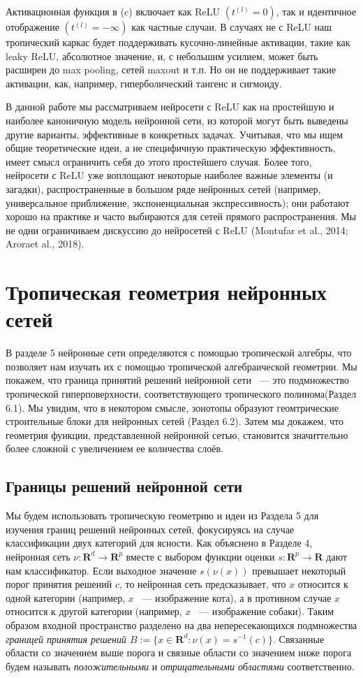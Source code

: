 \documentclass[russian]{lecture-notes}
\begin{document}
	Активационная функция в (c) включает как ReLU $(t^{(l)} = 0)$, так и идентичное отображение $(t^{(l)} = - \infty)$ как частные случаи. В случаях не с ReLU наш тропический каркас будет поддерживать кусочно-линейные активации, такие как leaky ReLU, абсолютное значение, и, с небольшим усилием, может быть расширен до max pooling, сетей maxout и т.п. Но он не поддерживает такие активации, как, например, гиперболический тангенс и сигмоиду.
	
	В данной работе мы  рассматриваем нейросети с ReLU как на простейшую и наиболее каноничную модель нейронной сети,  из которой могут быть выведены другие варианты, эффективные в конкретных задачах. Учитывая, что мы ищем общие теоретические идеи, а не специфичную практическую эффективность, имеет смысл ограничить себя до этого простейшего случая. Более того, нейросети с ReLU уже воплощают некоторые наиболее важные элементы (и загадки), распространенные в большом ряде нейронных сетей (например, универсальное приближение, экспоненциальная экспрессивность); они работают хорошо на практике и часто выбираются для сетей прямого распространения. Мы не одни ограничиваем дискуссию до нейросетей с ReLU  (Montufar et al., 2014; Aroraet al., 2018).

	\section{Тропическая геометрия нейронных сетей}
	
	В разделе 5 нейронные сети определяются с помощью тропической алгебры, что позволяет нам изучать их с помощью тропической алгебраической геометрии. Мы покажем, что граница принятий решений нейронной сети ~--- это подмножество тропической гиперповерхности, соответствующего тропического полинома(Раздел 6.1). Мы увидим, что в некотором смысле, зонотопы образуют геомтрические строительные блоки для нейронных сетей (Раздел 6.2). Затем мы докажем, что геометрия функции, представленной нейронной сетью, становится значиттельно более сложной с увеличением ее количества слоёв.
	\subsection{Границы решений нейронной сети}
	
	Мы будем использовать тропическую геометрию и идеи из Раздела 5 для изучения границ решений нейронных сетей, фокусируясь на случае классификации двух категорий для ясности. Как объяснено в Разделе 4, нейронная сеть $\nu : \mathbf{R}^d \rightarrow \mathbf{R}^p$ вместе с выбором функции оценки $s: \mathbf{R}^p \rightarrow \mathbf{R}$ дают нам классификатор. Если выходное значение $s(\nu(x))$ превышает некоторый порог принятия решений $c$, то нейронная сеть предсказывает, что $x$ относится к одной категории (например, $x$ ~--- изображение кота), а в противном случае $x$ относится к другой категории (например, $x$ ~--- изображение собаки). Таким образом входной пространство разделено на два непересекающихся подмножества \textit{границей принятия решений $B := \{x \in \mathbf{R}^d : \nu(x) = s^{-1}(c)\} $}. Связанные области со значением выше порога и связные области со значением ниже порога будем называть \textit{положительными} и \textit{отрицательными областями} соответственно.
	
\end{document}
